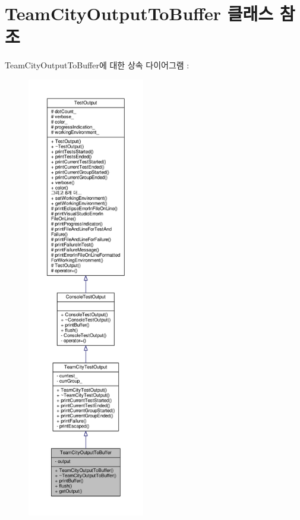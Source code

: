 \hypertarget{class_team_city_output_to_buffer}{}\section{Team\+City\+Output\+To\+Buffer 클래스 참조}
\label{class_team_city_output_to_buffer}


Team\+City\+Output\+To\+Buffer에 대한 상속 다이어그램 \+: 
\nopagebreak
\begin{figure}[H]
\begin{center}
\leavevmode
\includegraphics[height=550pt]{class_team_city_output_to_buffer__inherit__graph}
\end{center}
\end{figure}


